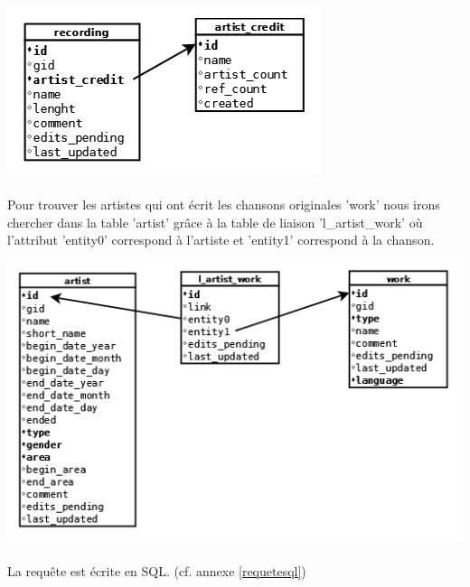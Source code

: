 \documentclass{report}
\begin{document}
		\begin{center}
			\includegraphics[scale=.5]{images/artist_credit.png}
		\end{center}


		\paragraph{}{
			Pour trouver les artistes qui ont écrit les chansons originales 'work' nous irons chercher dans la table 'artist' grâce à la table de liaison 'l\_artist\_work' où l’attribut 'entity0' correspond à l’artiste et 'entity1' correspond à la chanson.
		}

		\begin{center}
			\includegraphics[scale=.8]{images/artist_work.png}
		\end{center}
		
		\paragraph{}{
			La requête est écrite en SQL. (cf. annexe \ref{requetesql})
		}



%
\end{document}
